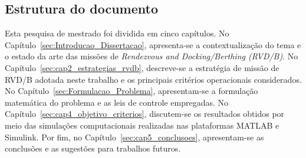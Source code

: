 \subsection{Estrutura do documento}

Esta pesquisa de mestrado foi dividida em cinco capítulos.
No Capítulo~\ref{sec:Introducao_Dissertacao}, apresenta-se a contextualização do tema e o estado da arte das missões de \emph{Rendezvous and Docking/Berthing (RVD/B)}.
No Capítulo~\ref{sec:cap2_estrategias_rvdb}, descreve-se a estratégia de missão de RVD/B adotada neste trabalho e os principais critérios operacionais considerados.
No Capítulo~\ref{sec:Formulacao_Problema}, apresentam-se a formulação matemática do problema e as leis de controle empregadas.
No Capítulo~\ref{sec:cap4_objetivo_criterios}, discutem-se os resultados obtidos por meio das simulações computacionais realizadas nas plataformas MATLAB e Simulink.
Por fim, no Capítulo~\ref{sec:cap5_conclusoes}, apresentam-se as conclusões e as sugestões para trabalhos futuros.
